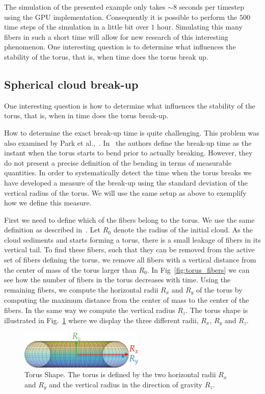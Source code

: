 The simulation of the presented example only takes ${\sim}8$ seconds per timestep using the GPU implementation. Consequently it is possible to perform the $500$ time steps of the simulation in a little bit over $1$ hour. Simulating this many fibers in such a short time will allow for new research of this interesting phenomenon. One interesting question is to determine what influences the stability of the torus, that is, when time does the torus break up.

\subsection{Spherical cloud break-up}
\label{subsec:sphere_break}

One interesting question is how to determine what influences the stability of the torus, that is, when in time does the torus break-up.

How to determine the exact break-up time is quite challenging. This problem was also examined by Park et al.,~\cite{Park2010}. In~\cite{Park2010} the authors define the break-up time as the instant when the torus starts to bend prior to actually breaking. However, they do not present a precise definition of the bending in terms of measurable quantities. In order to systematically detect the time when the torus breaks we have developed a measure of the break-up using the standard deviation of the vertical radius of the torus.  We will use the same setup as above to exemplify how we define this measure.

First we need to define which of the fibers belong to the torus. We use the same definition as described in~\cite{Park2010}. Let $R_0$ denote the radius of the initial cloud. As the cloud sediments and starts forming a torus, there is a small leakage of fibers in its vertical tail. To find these fibers, such that they can be removed from the active set of fibers defining the torus, we remove all fibers with a vertical distance from the center of mass of the torus larger than $R_0$. In Fig~\ref{fig:torus_fibers} we can see how the number of fibers in the torus decreases with time. Using the remaining fibers, we compute the horizontal radii $R_x$ and $R_y$ of the torus by computing the maximum distance from the center of mass to the center of the fibers. In the same way we compute the vertical radius $R_z$. The torus shape is illustrated in Fig.~\ref{fig:torus_shape} where we display the three different radii, $R_x$, $R_y$ and $R_z$.

\begin{figure}[htbp]
  \centering
  \includegraphics[width=0.525\textwidth]{img/torus3.png}
  \caption[Torus Shape.]{Torus Shape. The torus is defined by the two horizontal radii $R_x$ and $R_y$ and the vertical radius in the direction of gravity $R_z$.}
  \label{fig:torus_shape}
\end{figure}

